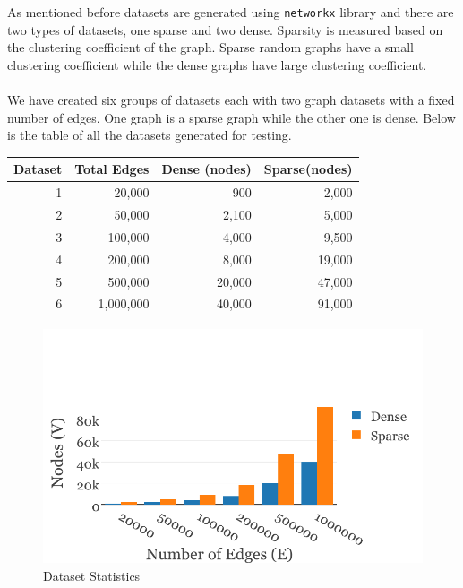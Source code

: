 As mentioned before datasets are generated using \texttt{networkx} library and there are two types of datasets, one sparse and two dense. Sparsity is measured based on the clustering coefficient of the graph. Sparse random graphs have a small clustering coefficient while the dense graphs have large clustering coefficient.\\
\\
We have created six groups of datasets each with two graph datasets with a fixed number of edges. One graph is a sparse graph while the other one is dense. Below is the table of all the datasets generated for testing.
\begin{table}[h]
\centering
	\begin{tabular}{|r|r|r|r|}
		\hline
		\multicolumn{1}{|c|}{Dataset} & \multicolumn{1}{c|}{Total Edges} & \multicolumn{1}{c|}{Dense (nodes)} & \multicolumn{1}{c|}{Sparse(nodes)} \\ \hline
		1                             & 20,000                           & 900                                & 2,000                              \\ \hline
		2                             & 50,000                           & 2,100                              & 5,000                              \\ \hline
		3                             & 100,000                          & 4,000                              & 9,500                              \\ \hline
		4                             & 200,000                          & 8,000                              & 19,000                             \\ \hline
		5                             & 500,000                          & 20,000                             & 47,000                             \\ \hline
		6                             & 1,000,000                        & 40,000                             & 91,000                             \\ \hline
	\end{tabular}
\end{table}

\begin{figure}
	\centering
	\includegraphics[scale=0.7, trim = 0 0 20 0]{Graphs/dataset-stats.pdf}
	\caption{Dataset Statistics \label{fig:datasets}}
\end{figure}

